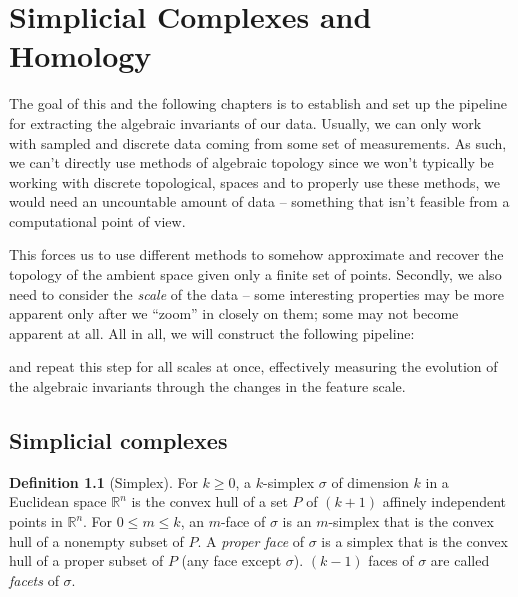 \chapter{Simplicial Complexes and Homology}
\graphicspath{ {/home/tomasp/Dokumenty/Master_Thesis/figures/} }
\theoremstyle{definition}
\newtheorem{definition}{Definition}[section]
\newtheorem{theorem}{Theorem}[section]
\newtheorem{lemma}{Lemma}[section]
\newtheorem{corollary}{Corollary}[section]
\newtheorem{example}{Example}[section]
\newtheorem*{remark}{Remark}

The goal of this and the following chapters is to establish and set up the pipeline for extracting the algebraic invariants of our data. Usually, we can only work with sampled and discrete data coming from some set of measurements. As such, we can't directly use methods of algebraic topology since we won't typically be working with discrete topological, spaces and to properly use these methods, we would need an uncountable amount of data -- something that isn't feasible from a computational point of view.
\par
This forces us to use different methods to somehow approximate and recover the topology of the ambient space given only a finite set of points. Secondly, we also need to consider the \textit{scale} of the data -- some interesting properties may be more apparent only after we ``zoom'' in closely on them; some may not become apparent at all. All in all, we will construct the following pipeline:

\begin{center}
\end{center}

\noindent
and repeat this step for all scales at once, effectively measuring the evolution of the algebraic invariants through the changes in the feature scale.

\section{Simplicial complexes}
\begin{definition}[Simplex]
  For $k \geq 0$, a $k$-simplex $\sigma$ of dimension $k$ in a Euclidean space $\mathbb{R}^{n}$ is the convex hull of a set $P$ of $(k+1)$ affinely independent points in $\mathbb{R}^{n}$. For $0 \leq m \leq k$, an $m$-face of $\sigma$ is an $m$-simplex that is the convex hull of a nonempty subset of $P$. A \textit{proper face} of $\sigma$ is a simplex that is the convex hull of a proper subset of $P$ (any face except $\sigma$). $(k-1)$ faces of $\sigma$ are called \textit{facets} of $\sigma$.
\end{definition}

